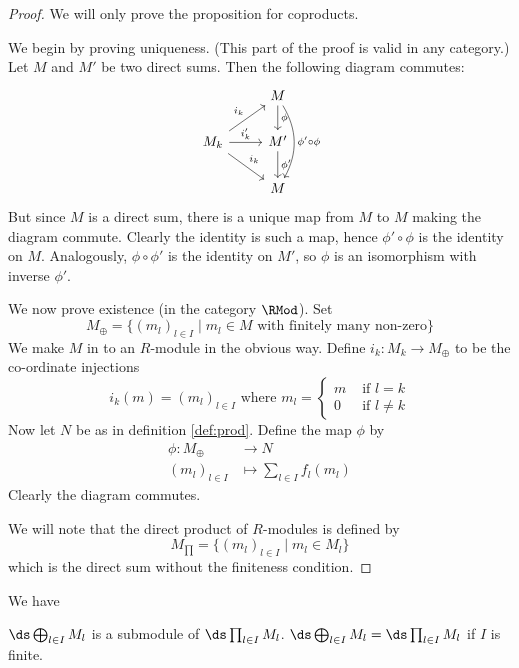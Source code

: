 \begin{proof}
	We will only prove the proposition for coproducts.
	
	We begin by proving uniqueness.
	(This part of the proof is valid in any category.)
	Let $M$ and $M'$ be two direct sums.
	Then the following diagram commutes:
	\[
		\begin{tikzcd}
			& M \arrow[d, "\phi"] \arrow[dd, "\phi'\circ\phi", bend left] \\
			M_k \arrow[ru, "i_k"] \arrow[r, "i_k'"] \arrow[rd, "i_k"] & M' \arrow[d, "\phi'"] \\
			& M
		\end{tikzcd}
	\]
	But since $M$ is a direct sum, there is a unique map from $M$ to $M$ making the diagram commute.
	Clearly the identity is such a map, hence $\phi'\circ\phi$ is the identity on $M$.
	Analogously, $\phi\circ\phi'$ is the identity on $M'$, so $\phi$ is an isomorphism with inverse $\phi'$.
	
	We now prove existence (in the category $\RMod$).
	Set
	\[M_\oplus = \{(m_l)_{l \in I} \mid m_l \in M \text{ with finitely many non-zero}\}\]
	We make $M$ in to an $R$-module in the obvious way.
	Define $i_k: M_k \to M_\oplus$ to be the co-ordinate injections
	\[i_k(m) = (m_l)_{l \in I} \text{ where } m_l =
		\begin{cases}
			m & \text{ if } l = k \\
			0 & \text{ if } l \neq k
		\end{cases}
	\]
	Now let $N$ be as in definition \ref{def:prod}.
	Define the map $\phi$ by
	\begin{align*}
		\phi: M_\oplus &\to N \\
		(m_l)_{l \in I} &\mapsto \sum_{l \in I}f_l(m_l)
	\end{align*}
	Clearly the diagram commutes.
	
	We will note that the direct product of $R$-modules is defined by
	\[M_{\prod} = \{(m_l)_{l \in I} \mid m_l \in M_l\}\]
	which is the direct sum without the finiteness condition.
\end{proof}

\begin{rmk}
	We have
	\begin{enum}
		\io $\ds \bigoplus_{l \in I} M_l$ is a submodule of $\ds \prod_{l \in I} M_l$.
		\io $\ds \bigoplus_{l \in I} M_l = \ds \prod_{l \in I} M_l$ if $I$ is finite.
	\end{enum}
\end{rmk}